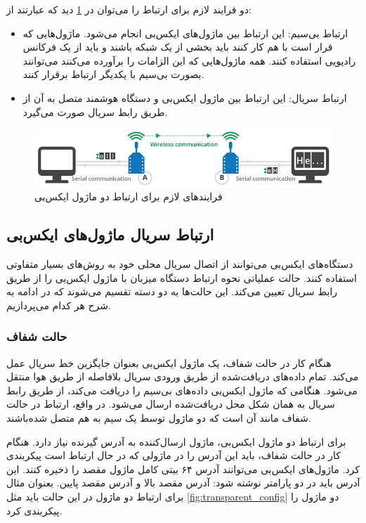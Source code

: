 دو فرایند لازم برای ارتباط را می‌توان در \cref{fig:xbee_communication} \cite{Digi} دید که عبارتند از:
\begin{itemize}
\item ارتباط بی‌سیم: این ارتباط بین ماژول‌های ایکس‌بی انجام می‌شود. ماژول‌هایی که قرار است با هم کار کنند باید بخشی از یک شبکه باشند و باید از یک فرکانس رادیویی استفاده کنند. همه ماژول‌هایی که این الزامات را برآورده می‌کنند می‌توانند بصورت بی‌سیم با یکدیگر ارتباط برقرار کنند.
\item ارتباط سریال: این ارتباط بین ماژول ایکس‌بی و دستگاه هوشمند متصل به آن از طریق رابط سریال صورت می‌گیرد.
\end{itemize}

\begin{figure}[!h]
\centering\includegraphics[scale=.7]{xbee_communication.png}
\caption{فرایندهای لازم برای ارتباط دو ماژول ایکس‌بی \cite{Digi}}\label{fig:xbee_communication}
\end{figure}

\subsection{ارتباط سریال ماژول‌های ایکس‌بی}\label{sub:xbee}

دستگاه‌های ایکس‌بی می‌توانند از اتصال سریال محلی خود به روش‌های بسیار متفاوتی استفاده کنند. حالت عملیاتی نحوه ارتباط دستگاه میزبان با ماژول ایکس‌بی را از طریق رابط سریال تعیین می‌کند. این حالت‌ها به دو دسته تقسیم می‌شوند که در ادامه به شرح هر کدام می‌پردازیم.

\subsubsection{حالت شفاف}

هنگام کار در حالت شفاف، یک ماژول ایکس‌بی بعنوان جایگزین خط سریال عمل می‌کند. تمام داده‌های دریافت‌شده از طریق ورودی سریال بلافاصله از طریق هوا منتقل می‌شود. هنگامی که ماژول ایکس‌بی داده‌های بی‌سیم را دریافت می‌کند، از طریق رابط سریال به همان شکل محل دریافت‌شده ارسال می‌شود. در واقع، ارتباط در حالت شفاف مانند آن است که دو ماژول توسط یک سیم به هم متصل شده‌باشند\cite{Digi}.


برای ارتباط دو ماژول ایکس‌بی، ماژول ارسال‌کننده به آدرس گیرنده نیاز دارد. هنگام کار در حالت شفاف، باید این آدرس را در ماژولی که در حال ارتباط است پیکربندی کرد. ماژول‌های ایکس‌بی می‌توانند آدرس ۶۴ بیتی کامل ماژول مقصد را ذخیره کنند\cite{Digi}. این آدرس باید در دو پارامتر نوشته شود: آدرس مقصد بالا و آدرس مقصد پایین. بعنوان مثال برای ارتباط دو ماژول در این حالت باید مثل \cref{fig:transparent_config} \cite{Digi} دو ماژول را پیکربندی کرد.


